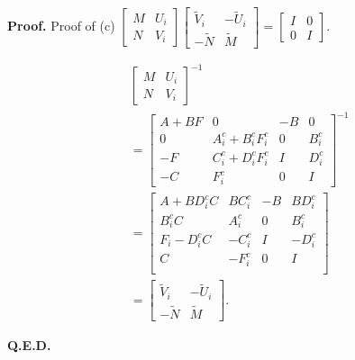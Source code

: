 \documentclass[trsc,nonblindrev]{informs3} %
\begin{document}
\begin{APPENDICES}
    \textbf{Proof.} Proof of (c) $\left[\begin{array}{cc}
                M & U_{i} \\
                N & V_{i}
            \end{array}\right]\left[\begin{array}{cc}
                \tilde{V}_{i} & -\tilde{U}_{i} \\
                -\tilde{N}    & \tilde{M}
            \end{array}\right]=\left[\begin{array}{cc}
                I & 0 \\
                0 & I
            \end{array}\right].$

    \begin{equation}
        \begin{aligned}
             & \left[\begin{array}{cc}
                    M & U_{i} \\
                    N & V_{i}
                \end{array}\right]^{-1}  \\
             & =\left[\begin{array}{cc|cc}
                    A+B F     & 0                             & -B & 0         \\
                    0         & A_{i}^{c}+B_{i}^{c} F_{i}^{c} & 0  & B_{i}^{c} \\
                    \hline -F & C_{i}^{c}+D_{i}^{c} F_{i}^{c} & I  & D_{i}^{c} \\
                    -C        & F_{i}^{c}                     & 0  & I
                \end{array}\right]^{-1} \\
             & =\left[\begin{array}{cc|cc}
                    A+B  D_{i}^{c} C          & B  C_{i}^{c} & -B & B  D_{i}^{c} \\
                    B_{i}^{c} C               & A_{i}^{c}    & 0  & B_{i}^{c}    \\
                    \hline F_{i}- D_{i}^{c} C & -C_{i}^{c}   & I  & -D_{i}^{c}   \\
                    C                         & -F_{i}^{c}   & 0  & I            \\
                \end{array}\right]      \\
             & =\left[\begin{array}{cc}
                    \tilde{V}_{i} & -\tilde{U}_{i} \\
                    -\tilde{N}    & \tilde{M}
                \end{array}\right].
        \end{aligned}
    \end{equation}

    \textbf{Q.E.D.}

\end{APPENDICES}
\end{document}
